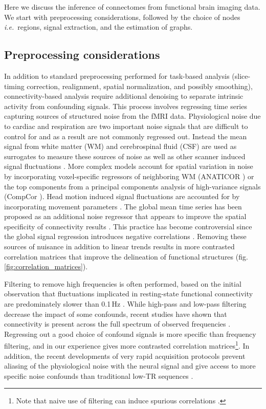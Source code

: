 \documentclass[5p]{elsarticle}
\begin{document}
Here we discuss the inference of connectomes from functional brain
imaging data. We start with preprocessing considerations, followed by
the choice of nodes \emph{i.e.}\ regions,
signal extraction, and the estimation of graphs.  

\subsection{Preprocessing considerations}

In addition to standard preprocessing performed for task-based analysis
(slice-timing correction, realignment, spatial normalization, and possibly
smoothing), connectivity-based analysis require additional denoising 
to separate intrinsic activity from confounding signals. This process involves
regressing time series capturing sources of structured noise from the fMRI data.
Physiological noise due to cardiac and respiration are two important
noise signals \cite{hu1995, lund2006, birn2006, birn2008} that are
difficult to control for and as a result are not commonly regressed out. Instead
the mean signal from white matter (WM) and cerebrospinal fluid (CSF) are used as
surrogates to measure these sources of noise as well as other scanner induced
signal fluctuations \cite{fox2005, lund2006}. More complex models account for
spatial variation in noise by incorporating voxel-specific regressors of
neighboring WM (ANATICOR \cite{jo2010}) or the top components from a
principal
components analysis of high-variance signals (CompCor \cite{behzadi2007}). Head motion
induced signal fluctuations are accounted for by incorporating movement
parameters \cite{friston1996, fox2005, lund2006}. The global mean time series
has been proposed as an additional noise regressor that appears to improve the
spatial specificity of connectivity results \cite{fox2005, fox2009}. This practice
has become controversial since the global signal regression introduces negative correlations
\cite{murphy2009,chang2009,saad2012}. 
Removing these sources of
nuisance in addition to linear trends results in more contrasted
correlation matrices that improve the delineation of functional structures
(fig.\,\ref{fig:correlation_matrices}). 

Filtering to remove high frequencies is often performed, based on the initial
observation that fluctuations implicated in resting-state functional
connectivity are predominately slower than 0.1\,Hz \cite{cordes2001,biswal1995}.
While high-pass and low-pass filtering decrease the impact of some confounds,
recent studies have shown that connectivity is present across the
full spectrum of observed frequencies \cite{smith2012,vanoort2012}. Regressing
out a good choice of confound signals is more specific than frequency
filtering,
and in our experience gives more contrasted correlation matrices\footnote{Note
	that naive use of filtering can induce spurious correlations
	\cite{davey2012}.}.
In addition, the recent developments of very rapid acquisition 
protocols prevent aliasing of the physiological noise with the neural 
signal and give access to more specific noise confounds than traditional
low-TR sequences \cite{boyaciouglu2012}.
\end{document}
